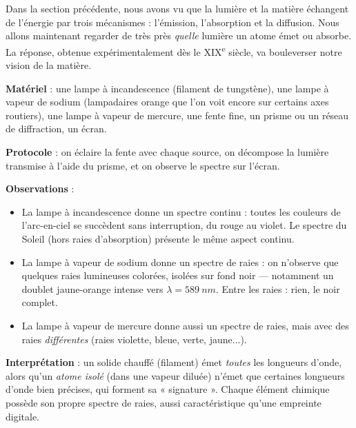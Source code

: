 \documentclass[11pt]{article}
\newcommand{\cle}[1]{{\popxbold\color{popdark}#1}}
\begin{document}
Dans la section précédente, nous avons vu que la lumière et la matière échangent de l'énergie par trois mécanismes : l'\cle{émission}, l'\cle{absorption} et la \cle{diffusion}. Nous allons maintenant regarder de très près \emph{quelle} lumière un atome émet ou absorbe. La réponse, obtenue expérimentalement dès le XIX\textsuperscript{e} siècle, va bouleverser notre vision de la matière.

\begin{experience}
\textbf{Matériel} : une lampe à incandescence (filament de tungstène), une lampe à vapeur de sodium (lampadaires orange que l'on voit encore sur certains axes routiers), une lampe à vapeur de mercure, une fente fine, un prisme ou un réseau de diffraction, un écran.

\textbf{Protocole} : on éclaire la fente avec chaque source, on décompose la lumière transmise à l'aide du prisme, et on observe le spectre sur l'écran.

\textbf{Observations} :
\begin{itemize}
\item La lampe à incandescence donne un \cle{spectre continu} : toutes les couleurs de l'arc-en-ciel se succèdent sans interruption, du rouge au violet. Le spectre du Soleil (hors raies d'absorption) présente le même aspect continu.
\item La lampe à vapeur de sodium donne un \cle{spectre de raies} : on n'observe que quelques raies lumineuses colorées, isolées sur fond noir — notamment un doublet jaune-orange intense vers $\lambda = \SI{589}{nm}$. Entre les raies : rien, le noir complet.
\item La lampe à vapeur de mercure donne aussi un spectre de raies, mais avec des raies \emph{différentes} (raies violette, bleue, verte, jaune...).
\end{itemize}

\textbf{Interprétation} : un solide chauffé (filament) émet \emph{toutes} les longueurs d'onde, alors qu'un \emph{atome isolé} (dans une vapeur diluée) n'émet que certaines longueurs d'onde bien précises, qui forment sa « signature ». Chaque élément chimique possède son propre spectre de raies, aussi caractéristique qu'une empreinte digitale.
\end{experience}
\end{document}
